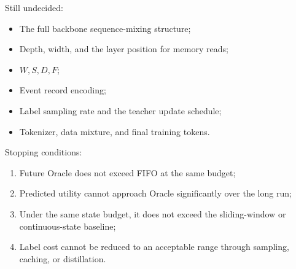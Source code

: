 Still undecided:

\begin{itemize}
  \item The full backbone sequence-mixing structure;
  \item Depth, width, and the layer position for memory reads;
  \item $W,S,D,F$;
  \item Event record encoding;
  \item Label sampling rate and the teacher update schedule;
  \item Tokenizer, data mixture, and final training tokens.
\end{itemize}

Stopping conditions:

\begin{enumerate}
  \item Future Oracle does not exceed FIFO at the same budget;
  \item Predicted utility cannot approach Oracle significantly over the long run;
  \item Under the same state budget, it does not exceed the sliding-window or continuous-state baseline;
  \item Label cost cannot be reduced to an acceptable range through sampling, caching, or distillation.
\end{enumerate}
